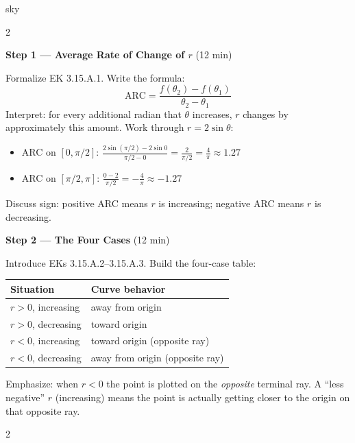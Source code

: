 \documentclass[10pt]{article}
\begin{document}
\begin{skillbox}{sky}
\begin{multicols}{2}

\textbf{Step 1 --- Average Rate of Change of $r$} (12 min)

Formalize EK 3.15.A.1. Write the formula:
$$\text{ARC} = \frac{f(\theta_2) - f(\theta_1)}{\theta_2 - \theta_1}$$
Interpret: for every additional radian that $\theta$ increases, $r$ changes by
approximately this amount. Work through $r = 2\sin\theta$:
\begin{itemize}[leftmargin=1.3em, itemsep=2pt]
  \item ARC on $[0, \pi/2]$: $\frac{2\sin(\pi/2) - 2\sin 0}{\pi/2 - 0} = \frac{2}{\pi/2} = \frac{4}{\pi} \approx 1.27$
  \item ARC on $[\pi/2, \pi]$: $\frac{0 - 2}{\pi/2} = -\frac{4}{\pi} \approx -1.27$
\end{itemize}
Discuss sign: positive ARC means $r$ is increasing; negative ARC means $r$ is decreasing.

\columnbreak

\textbf{Step 2 --- The Four Cases} (12 min)

Introduce EKs 3.15.A.2--3.15.A.3. Build the four-case table:

\vspace{4pt}
\renewcommand{\arraystretch}{1.4}
\begin{tabular}{|l|l|}
\hline
\textbf{Situation} & \textbf{Curve behavior} \\
\hline
$r > 0$, increasing & away from origin \\
$r > 0$, decreasing & toward origin \\
$r < 0$, increasing & toward origin (opposite ray) \\
$r < 0$, decreasing & away from origin (opposite ray) \\
\hline
\end{tabular}

\vspace{4pt}
Emphasize: when $r < 0$ the point is plotted on the \emph{opposite} terminal ray.
A ``less negative'' $r$ (increasing) means the point is actually getting closer to
the origin on that opposite ray.

\end{multicols}

\begin{multicols}{2}


\end{multicols}
\end{skillbox}
\end{document}
